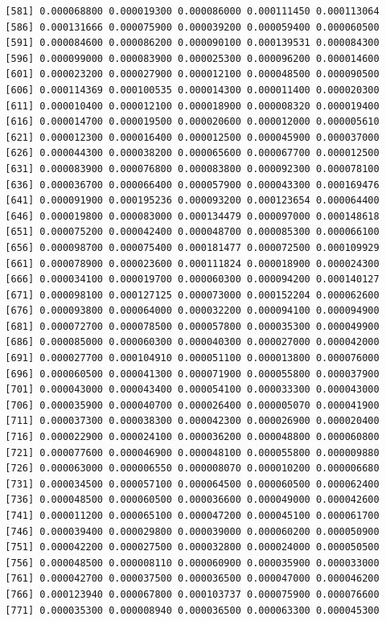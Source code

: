 \documentclass[]{article}
\begin{document}
\begin{verbatim}
  [581] 0.000068800 0.000019300 0.000086000 0.000111450 0.000113064
  [586] 0.000131666 0.000075900 0.000039200 0.000059400 0.000060500
  [591] 0.000084600 0.000086200 0.000090100 0.000139531 0.000084300
  [596] 0.000099000 0.000083900 0.000025300 0.000096200 0.000014600
  [601] 0.000023200 0.000027900 0.000012100 0.000048500 0.000090500
  [606] 0.000114369 0.000100535 0.000014300 0.000011400 0.000020300
  [611] 0.000010400 0.000012100 0.000018900 0.000008320 0.000019400
  [616] 0.000014700 0.000019500 0.000020600 0.000012000 0.000005610
  [621] 0.000012300 0.000016400 0.000012500 0.000045900 0.000037000
  [626] 0.000044300 0.000038200 0.000065600 0.000067700 0.000012500
  [631] 0.000083900 0.000076800 0.000083800 0.000092300 0.000078100
  [636] 0.000036700 0.000066400 0.000057900 0.000043300 0.000169476
  [641] 0.000091900 0.000195236 0.000093200 0.000123654 0.000064400
  [646] 0.000019800 0.000083000 0.000134479 0.000097000 0.000148618
  [651] 0.000075200 0.000042400 0.000048700 0.000085300 0.000066100
  [656] 0.000098700 0.000075400 0.000181477 0.000072500 0.000109929
  [661] 0.000078900 0.000023600 0.000111824 0.000018900 0.000024300
  [666] 0.000034100 0.000019700 0.000060300 0.000094200 0.000140127
  [671] 0.000098100 0.000127125 0.000073000 0.000152204 0.000062600
  [676] 0.000093800 0.000064000 0.000032200 0.000094100 0.000094900
  [681] 0.000072700 0.000078500 0.000057800 0.000035300 0.000049900
  [686] 0.000085000 0.000060300 0.000040300 0.000027000 0.000042000
  [691] 0.000027700 0.000104910 0.000051100 0.000013800 0.000076000
  [696] 0.000060500 0.000041300 0.000071900 0.000055800 0.000037900
  [701] 0.000043000 0.000043400 0.000054100 0.000033300 0.000043000
  [706] 0.000035900 0.000040700 0.000026400 0.000005070 0.000041900
  [711] 0.000037300 0.000038300 0.000042300 0.000026900 0.000020400
  [716] 0.000022900 0.000024100 0.000036200 0.000048800 0.000060800
  [721] 0.000077600 0.000046900 0.000048100 0.000055800 0.000009880
  [726] 0.000063000 0.000006550 0.000008070 0.000010200 0.000006680
  [731] 0.000034500 0.000057100 0.000064500 0.000060500 0.000062400
  [736] 0.000048500 0.000060500 0.000036600 0.000049000 0.000042600
  [741] 0.000011200 0.000065100 0.000047200 0.000045100 0.000061700
  [746] 0.000039400 0.000029800 0.000039000 0.000060200 0.000050900
  [751] 0.000042200 0.000027500 0.000032800 0.000024000 0.000050500
  [756] 0.000048500 0.000008110 0.000060900 0.000035900 0.000033000
  [761] 0.000042700 0.000037500 0.000036500 0.000047000 0.000046200
  [766] 0.000123940 0.000067800 0.000103737 0.000075900 0.000076600
  [771] 0.000035300 0.000008940 0.000036500 0.000063300 0.000045300

\end{verbatim}
\end{document}
